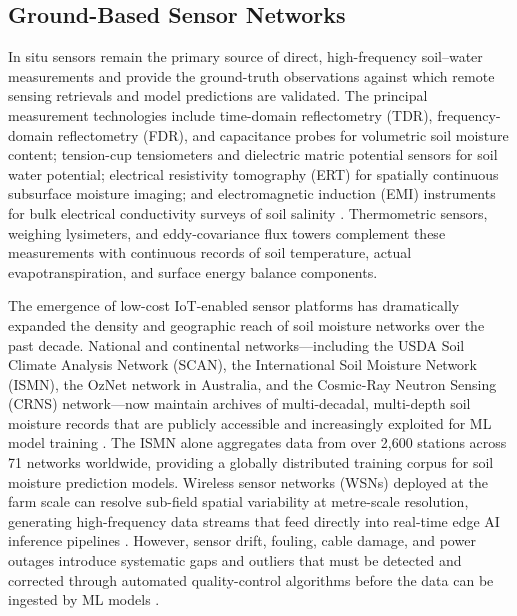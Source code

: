 \documentclass[land,article,submit,pdftex,moreauthors]{Definitions/mdpi}
\numberwithin{equation}{section}
\begin{document}
\subsection{Ground-Based Sensor Networks}

In situ sensors remain the primary source of direct, high-frequency soil--water measurements and provide the ground-truth observations against which remote sensing retrievals and model predictions are validated. The principal measurement technologies include time-domain reflectometry (TDR), frequency-domain reflectometry (FDR), and capacitance probes for volumetric soil moisture content; tension-cup tensiometers and dielectric matric potential sensors for soil water potential; electrical resistivity tomography (ERT) for spatially continuous subsurface moisture imaging; and electromagnetic induction (EMI) instruments for bulk electrical conductivity surveys of soil salinity \citep{vereecken2014soil}. Thermometric sensors, weighing lysimeters, and eddy-covariance flux towers complement these measurements with continuous records of soil temperature, actual evapotranspiration, and surface energy balance components.

The emergence of low-cost IoT-enabled sensor platforms has dramatically expanded the density and geographic reach of soil moisture networks over the past decade. National and continental networks---including the USDA Soil Climate Analysis Network (SCAN), the International Soil Moisture Network (ISMN), the OzNet network in Australia, and the Cosmic-Ray Neutron Sensing (CRNS) network---now maintain archives of multi-decadal, multi-depth soil moisture records that are publicly accessible and increasingly exploited for ML model training \citep{dorigo2021ismn}. The ISMN alone aggregates data from over 2,600 stations across 71 networks worldwide, providing a globally distributed training corpus for soil moisture prediction models. Wireless sensor networks (WSNs) deployed at the farm scale can resolve sub-field spatial variability at metre-scale resolution, generating high-frequency data streams that feed directly into real-time edge AI inference pipelines \citep{vij2020iot}. However, sensor drift, fouling, cable damage, and power outages introduce systematic gaps and outliers that must be detected and corrected through automated quality-control algorithms before the data can be ingested by ML models \citep{gruber2020}.
\end{document}
